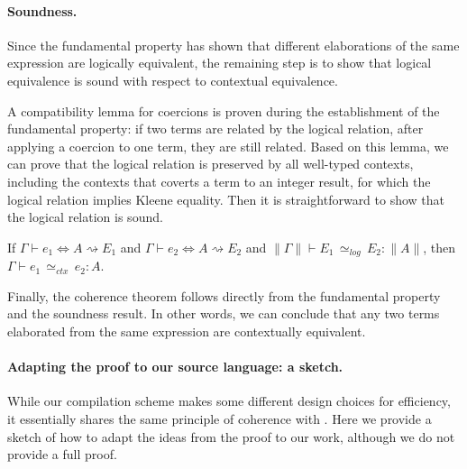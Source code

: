 \paragraph{Soundness.}
Since the fundamental property has shown that different elaborations of the same
\necolus expression are logically equivalent, the remaining step is to show that
logical equivalence is sound with respect to contextual equivalence.

A compatibility lemma for coercions is proven during the establishment of the
fundamental property: if two terms are related by the logical relation, after
applying a coercion to one term, they are still related. Based on this lemma, we
can prove that the logical relation is preserved by all well-typed \necolus
contexts, including the contexts that coverts a term to an integer result, for
which the logical relation implies Kleene equality. Then it is straightforward
to show that the logical relation is sound.

\begin{theorem}
If \( \Gamma \vdash e_1 \Leftrightarrow A  \rightsquigarrow E_1 \)
and \( \Gamma \vdash e_2 \Leftrightarrow A  \rightsquigarrow E_2 \)
and \( \|\Gamma\| \vdash E_1 \, {\simeq}_\mathit{log} \, E_2 : \|A\| \),
then \( \Gamma \vdash e_1 \, {\simeq}_\mathit{ctx} \, e_2 : A \).
\end{theorem}

\noindent
Finally, the coherence theorem follows directly from the fundamental property
and the soundness result. In other words, we can conclude that any two \lambdac
terms elaborated from the same \necolus expression are contextually equivalent.

\paragraph{Adapting the proof to our source language: a sketch.}
While our compilation scheme makes some different design choices for efficiency,
it essentially shares the same principle of coherence with \necolus. Here we
provide a sketch of how to adapt the ideas from the \necolus proof to our work,
although we do not provide a full proof.

